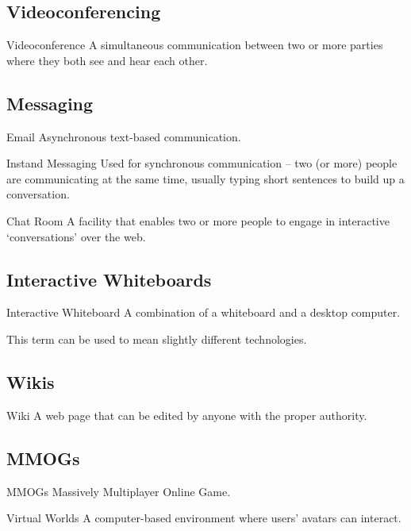\documentclass[\main/notes.tex]{subfiles}
\begin{document}
			\subsection{Videoconferencing}
				\begin{definition}{Videoconference}
					A simultaneous communication between two or more parties where they both see and hear each other.
				\end{definition}
			\subsection{Messaging}
				\begin{definition}{Email}
					Asynchronous text-based communication.
				\end{definition}
				\begin{definition}{Instand Messaging}
					Used for synchronous communication -- two (or more) people are communicating at the same time, usually typing short sentences to build up a conversation.
				\end{definition}
				\begin{definition}{Chat Room}
					A facility that enables two or more people to engage in interactive `conversations' over the web.
				\end{definition}
			\subsection{Interactive Whiteboards}
				\begin{definition}{Interactive Whiteboard}
					A combination of a whiteboard and a desktop computer.

					This term can be used to mean slightly different technologies.
				\end{definition}
			\subsection{Wikis}
				\begin{definition}{Wiki}
					A web page that can be edited by anyone with the proper authority.
				\end{definition}
			\subsection{MMOGs}
				\begin{definition}{MMOGs}
					Massively Multiplayer Online Game.
				\end{definition}
				\begin{definition}{Virtual Worlds}
					A computer-based environment where users' avatars can interact.
				\end{definition}
\end{document}
